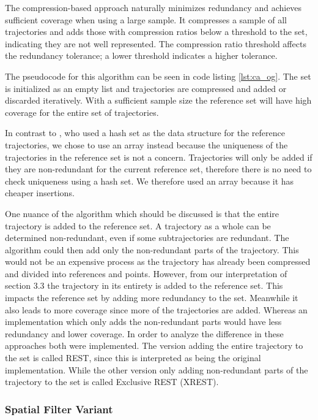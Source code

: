 The compression-based approach naturally minimizes redundancy and achieves sufficient coverage when using a large sample. It compresses a sample of all trajectories and adds those with compression ratios below a threshold to the set, indicating they are not well represented. The compression ratio threshold affects the redundancy tolerance; a lower threshold indicates a higher tolerance.

The pseudocode for this algorithm can be seen in code listing \ref{lst:ca_og}. The set is initialized as an empty list and trajectories are compressed and added or discarded iteratively. With a sufficient sample size the reference set will have high coverage for the entire set of trajectories.

In contrast to \textcite{zhao2018rest}, who used a hash set as the data structure for the reference trajectories, we chose to use an array instead because the uniqueness of the trajectories in the reference set is not a concern. Trajectories will only be added if they are non-redundant for the current reference set, therefore there is no need to check uniqueness using a hash set. We therefore used an array because it has cheaper insertions.

One nuance of the algorithm which should be discussed is that the entire trajectory is added to the reference set. A trajectory as a whole can be determined non-redundant, even if some subtrajectories are redundant. The algorithm could then add only the non-redundant parts of the trajectory. This would not be an expensive process as the trajectory has already been compressed and divided into references and points. However, from our interpretation of \cite{zhao2018rest} section 3.3 the trajectory in its entirety is added to the reference set. This impacts the reference set by adding more redundancy to the set. Meanwhile it also leads to more coverage since more of the trajectories are added. Whereas an implementation which only adds the non-redundant parts would have less redundancy and lower coverage. %
In order to analyze the difference in these approaches both were implemented. The version adding the entire trajectory to the set is called REST, since this is interpreted as being the original implementation. While the other version only adding non-redundant parts of the trajectory to the set is called Exclusive REST (XREST).

\subsubsection{Spatial Filter Variant}

